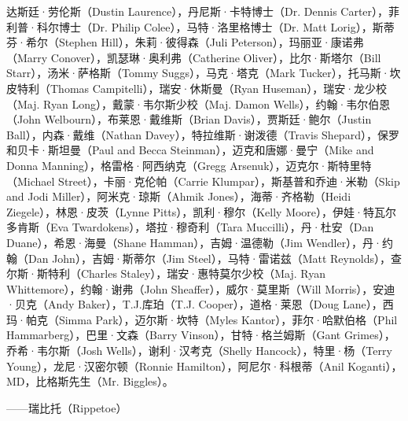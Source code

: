 达斯廷·劳伦斯（Dustin Laurence），丹尼斯·卡特博士（Dr. Dennis Carter），菲利普·科尔博士（Dr. Philip Colee），马特·洛里格博士（Dr. Matt Lorig），斯蒂芬·希尔（Stephen Hill），朱莉·彼得森（Juli Peterson），玛丽亚·康诺弗（Marry Conover），凯瑟琳·奥利弗（Catherine Oliver），比尔·斯塔尔（Bill Starr），汤米·萨格斯（Tommy Suggs），马克·塔克（Mark Tucker），托马斯·坎皮特利（Thomas Campitelli），瑞安·休斯曼（Ryan Huseman），瑞安·龙少校（Maj. Ryan Long），戴蒙·韦尔斯少校（Maj. Damon Wells），约翰·韦尔伯恩（John Welbourn），布莱恩·戴维斯（Brian Davis），贾斯廷·鲍尔（Justin Ball），内森·戴维（Nathan Davey），特拉维斯·谢泼德（Travis Shepard），保罗和贝卡·斯坦曼（Paul and Becca Steinman），迈克和唐娜·曼宁（Mike and Donna Manning），格雷格·阿西纳克（Gregg Arsenuk），迈克尔·斯特里特（Michael Street），卡丽·克伦帕（Carrie Klumpar），斯基普和乔迪·米勒（Skip and Jodi Miller），阿米克·琼斯（Ahmik Jones），海蒂·齐格勒（Heidi Ziegele），林恩·皮茨（Lynne Pitts），凯利·穆尔（Kelly Moore），伊娃·特瓦尔多肯斯（Eva Twardokens），塔拉·穆奇利（Tara Muccilli），丹·杜安（Dan Duane），希恩·海曼（Shane Hamman），吉姆·温德勒（Jim Wendler），丹·约翰（Dan John），吉姆·斯蒂尔（Jim Steel），马特·雷诺兹（Matt Reynolds），查尔斯·斯特利（Charles Staley），瑞安·惠特莫尔少校（Maj. Ryan Whittemore），约翰·谢弗（John Sheaffer），威尔·莫里斯（Will Morris），安迪·贝克（Andy Baker），T.J.库珀（T.J. Cooper），道格·莱恩（Doug Lane），西玛·帕克（Simma Park），迈尔斯·坎特（Myles Kantor），菲尔·哈默伯格（Phil Hammarberg），巴里·文森（Barry Vinson），甘特·格兰姆斯（Gant Grimes），乔希·韦尔斯（Josh Wells），谢利·汉考克（Shelly Hancock），特里·杨（Terry Young），龙尼·汉密尔顿（Ronnie Hamilton），阿尼尔·科根蒂（Anil Koganti），MD，比格斯先生（Mr. Biggles）。

\begin{flushright}
——瑞比托（Rippetoe）
\end{flushright}
